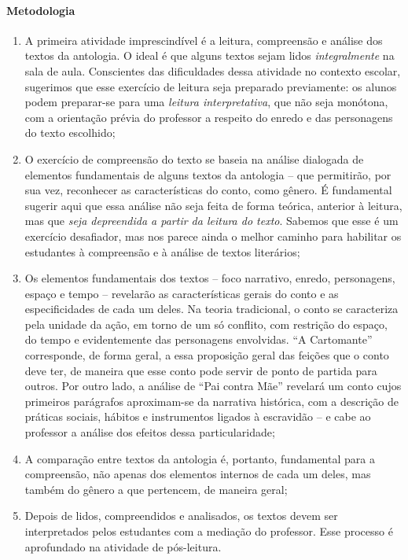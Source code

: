 \documentclass[11pt]{extarticle}
\begin{document}
\paragraph{Metodologia}
\begin{enumerate}
\item
A primeira atividade imprescindível é a leitura, compreensão e
análise dos textos da antologia. O ideal é que alguns textos sejam lidos
\emph{integralmente} na sala de aula. Conscientes das dificuldades dessa
atividade no contexto escolar, sugerimos que esse exercício de leitura
seja preparado previamente: os alunos podem preparar-se para uma
\emph{leitura interpretativa}, que não seja monótona, com a orientação
prévia do professor a respeito do enredo e das personagens do texto
escolhido;

\item
O exercício de compreensão do texto se baseia na análise dialogada de
elementos fundamentais de alguns textos da antologia -- que permitirão,
por sua vez, reconhecer as características do conto, como gênero. É
fundamental sugerir aqui que essa análise não seja feita de forma
teórica, anterior à leitura, mas que \emph{seja depreendida a partir da
leitura do texto}. Sabemos que esse é um exercício desafiador, mas nos
parece ainda o melhor caminho para habilitar os estudantes à compreensão
e à análise de textos literários;

\item
Os elementos fundamentais dos textos -- foco narrativo, enredo,
personagens, espaço e tempo -- revelarão as características gerais do
conto e as especificidades de cada um deles. Na teoria tradicional, o
conto se caracteriza pela unidade da ação, em torno de um só conflito,
com restrição do espaço, do tempo e evidentemente das personagens
envolvidas. ``A Cartomante'' corresponde, de forma geral, a essa
proposição geral das feições que o conto deve ter, de maneira que esse
conto pode servir de ponto de partida para outros. Por outro lado, a
análise de ``Pai contra Mãe'' revelará um conto cujos primeiros
parágrafos aproximam-se da narrativa histórica, com a descrição de
práticas sociais, hábitos e instrumentos ligados à escravidão -- e cabe
ao professor a análise dos efeitos dessa particularidade;

\item
A comparação entre textos da antologia é, portanto, fundamental para
a compreensão, não apenas dos elementos internos de cada um deles, mas
também do gênero a que pertencem, de maneira geral;

\item
Depois de lidos, compreendidos e analisados, os textos devem ser
interpretados pelos estudantes com a mediação do professor. Esse
processo é aprofundado na atividade de pós-leitura.
\end{enumerate}
\end{document}
